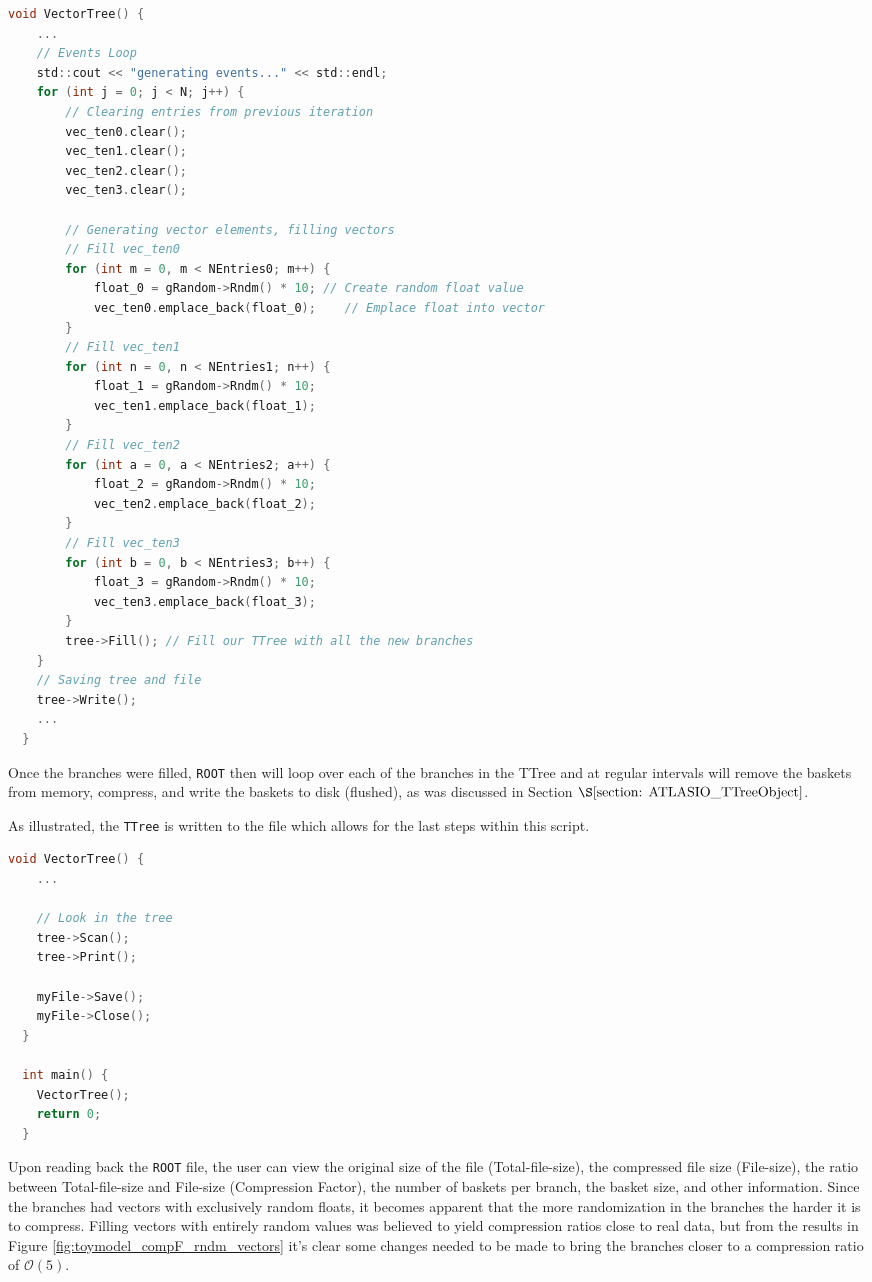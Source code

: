 \begin{lstlisting}[language=C]  
  void VectorTree() {
    ...
    // Events Loop
    std::cout << "generating events..." << std::endl;
    for (int j = 0; j < N; j++) {
        // Clearing entries from previous iteration
        vec_ten0.clear();
        vec_ten1.clear();
        vec_ten2.clear();
        vec_ten3.clear();

        // Generating vector elements, filling vectors
        // Fill vec_ten0
        for (int m = 0, m < NEntries0; m++) {
            float_0 = gRandom->Rndm() * 10; // Create random float value
            vec_ten0.emplace_back(float_0);    // Emplace float into vector
        }
        // Fill vec_ten1
        for (int n = 0, n < NEntries1; n++) {
            float_1 = gRandom->Rndm() * 10;
            vec_ten1.emplace_back(float_1);
        }
        // Fill vec_ten2
        for (int a = 0, a < NEntries2; a++) {
            float_2 = gRandom->Rndm() * 10;
            vec_ten2.emplace_back(float_2);
        }
        // Fill vec_ten3
        for (int b = 0, b < NEntries3; b++) {
            float_3 = gRandom->Rndm() * 10;
            vec_ten3.emplace_back(float_3);
        }
        tree->Fill(); // Fill our TTree with all the new branches
    }
    // Saving tree and file
    tree->Write();
    ...
  }
\end{lstlisting}
Once the branches were filled, \verb|ROOT| then will loop over each of the branches in the TTree and at regular intervals will remove the baskets from memory, compress, and write the baskets to disk (flushed), as was discussed in Section $\S \ref{section: ATLASIO_TTreeObject}$.

As illustrated, the \verb|TTree| is written to the file which allows for the last steps within this script. 

\begin{lstlisting}[language=C]  
  void VectorTree() {
    ...

    // Look in the tree
    tree->Scan();
    tree->Print();

    myFile->Save();
    myFile->Close();
  }

  int main() {
    VectorTree();
    return 0;
  } 
\end{lstlisting}

Upon reading back the \verb|ROOT| file, the user can view the original size of the file (Total-file-size), the compressed file size (File-size), the ratio between Total-file-size and File-size (Compression Factor), the number of baskets per branch, the basket size, and other information. 
Since the branches had vectors with exclusively random floats, it becomes apparent that the more randomization in the branches the harder it is to compress. 
Filling vectors with entirely random values was believed to yield compression ratios close to real data, but from the results in Figure \ref{fig:toymodel_compF_rndm_vectors} it's clear some changes needed to be made to bring the branches closer to a compression ratio of $\mathcal{O}(5)$.  

